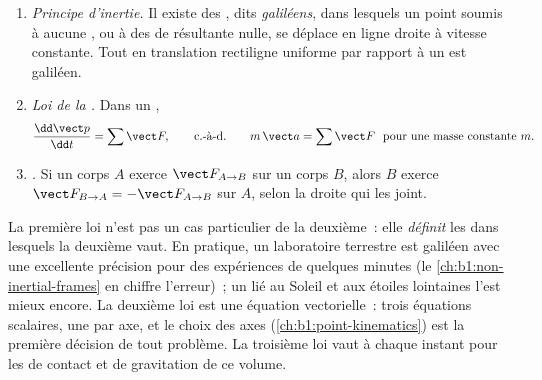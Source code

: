 \begin{theorem}\label{thm:b1:newton-dynamics:laws}
\begin{enumerate}
  \item \emph{Principe d'inertie.} Il existe des , dits
        \emph{galiléens}, dans lesquels un point soumis à aucune ,
        ou à des  de résultante nulle, se déplace en ligne droite
        à vitesse constante. Tout  en translation rectiligne
        uniforme par rapport à un  est galiléen.
  \item \emph{Loi de la .} Dans un ,
        \[
        \frac{\dd\vect p}{\dd t} = \sum\vect F, \qquad \text{c.-à-d.}\qquad
        m\,\vect a = \sum\vect F \ \text{ pour une masse constante } m .
        \]
  \item \emph{.} Si un corps $A$ exerce $\vect F_{A\to B}$
        sur un corps $B$, alors $B$ exerce $\vect F_{B\to A} = -\vect F_{A\to B}$
        sur $A$, selon la droite qui les joint.
\end{enumerate}
\end{theorem}
\admitted

\begin{remark}\label{rem:b1:newton-dynamics:meaning}
La première loi n'est pas un cas particulier de la deuxième~: elle
\emph{définit} les  dans lesquels la deuxième vaut. En
pratique, un laboratoire terrestre est galiléen avec une excellente
précision pour des expériences de quelques minutes (le
\cref{ch:b1:non-inertial-frames} en chiffre l'erreur)~; un 
lié au Soleil et aux étoiles lointaines l'est mieux encore. La deuxième
loi est une équation vectorielle~: trois équations scalaires, une par
axe, et le choix des axes (\cref{ch:b1:point-kinematics}) est la
première décision de tout problème. La troisième loi vaut à chaque
instant pour les  de contact et de gravitation de ce volume.
\end{remark}

